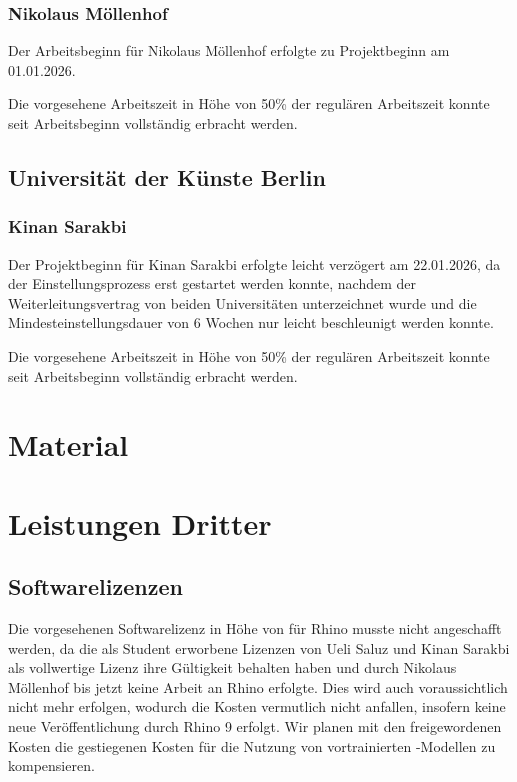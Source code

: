 \documentclass[type=zwischenbericht]{zukunftbau}
\begin{document}
\subsubsection{Nikolaus Möllenhof}
Der Arbeitsbeginn für Nikolaus Möllenhof erfolgte zu Projektbeginn am 01.01.2026.

Die vorgesehene Arbeitszeit in Höhe von 50\% der regulären Arbeitszeit konnte seit Arbeitsbeginn vollständig erbracht werden.

\subsection{Universität der Künste Berlin}

\subsubsection{Kinan Sarakbi}
Der Projektbeginn für Kinan Sarakbi erfolgte leicht verzögert am 22.01.2026, da der Einstellungsprozess erst gestartet werden konnte, nachdem der Weiterleitungsvertrag von beiden Universitäten unterzeichnet wurde und die Mindesteinstellungsdauer von 6 Wochen nur leicht beschleunigt werden konnte.

Die vorgesehene Arbeitszeit in Höhe von 50\% der regulären Arbeitszeit konnte seit Arbeitsbeginn vollständig erbracht werden.

\section{Material}

\section{Leistungen Dritter}

\subsection{Softwarelizenzen}

Die vorgesehenen Softwarelizenz in Höhe von für Rhino musste nicht angeschafft werden, da die als Student erworbene Lizenzen von Ueli Saluz und Kinan Sarakbi als vollwertige Lizenz ihre Gültigkeit behalten haben und durch Nikolaus Möllenhof bis jetzt keine Arbeit an Rhino erfolgte. Dies wird auch voraussichtlich nicht mehr erfolgen, wodurch die Kosten vermutlich nicht anfallen, insofern keine neue Veröffentlichung durch Rhino 9 erfolgt. Wir planen mit den freigewordenen Kosten die gestiegenen Kosten für die Nutzung von vortrainierten -Modellen zu kompensieren.
\end{document}
